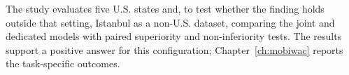 The study evaluates five
U.S. states and, to test whether the finding holds outside that setting,
Istanbul as a non-U.S. dataset, comparing the joint and dedicated models with
paired superiority and non-inferiority tests. The results support a positive answer for
this configuration; Chapter~\ref{ch:mobiwac} reports the task-specific outcomes.

